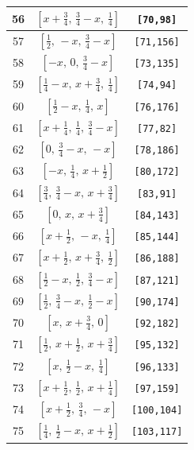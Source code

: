 \documentclass[fleqn,8pt]{jsarticle}
\begin{document}
\begin{longtable}{ccc}
56 & $\left[ x + \frac{3}{4},\, \frac{3}{4} - x,\, \frac{1}{4} \right]$ & {\tt [70,98]} \\ \hline
57 & $\left[ \frac{1}{2},\, - x,\, \frac{3}{4} - x \right]$ & {\tt [71,156]} \\ \hline
58 & $\left[ - x,\, 0,\, \frac{3}{4} - x \right]$ & {\tt [73,135]} \\ \hline
59 & $\left[ \frac{1}{4} - x,\, x + \frac{3}{4},\, \frac{1}{4} \right]$ & {\tt [74,94]} \\ \hline
60 & $\left[ \frac{1}{2} - x,\, \frac{1}{4},\, x \right]$ & {\tt [76,176]} \\ \hline
61 & $\left[ x + \frac{1}{4},\, \frac{1}{4},\, \frac{3}{4} - x \right]$ & {\tt [77,82]} \\ \hline
62 & $\left[ 0,\, \frac{3}{4} - x,\, - x \right]$ & {\tt [78,186]} \\ \hline
63 & $\left[ - x,\, \frac{1}{4},\, x + \frac{1}{2} \right]$ & {\tt [80,172]} \\ \hline
64 & $\left[ \frac{3}{4},\, \frac{3}{4} - x,\, x + \frac{3}{4} \right]$ & {\tt [83,91]} \\ \hline
65 & $\left[ 0,\, x,\, x + \frac{3}{4} \right]$ & {\tt [84,143]} \\ \hline
66 & $\left[ x + \frac{1}{2},\, - x,\, \frac{1}{4} \right]$ & {\tt [85,144]} \\ \hline
67 & $\left[ x + \frac{1}{2},\, x + \frac{3}{4},\, \frac{1}{2} \right]$ & {\tt [86,188]} \\ \hline
68 & $\left[ \frac{1}{2} - x,\, \frac{1}{2},\, \frac{3}{4} - x \right]$ & {\tt [87,121]} \\ \hline
69 & $\left[ \frac{1}{2},\, \frac{3}{4} - x,\, \frac{1}{2} - x \right]$ & {\tt [90,174]} \\ \hline
70 & $\left[ x,\, x + \frac{3}{4},\, 0 \right]$ & {\tt [92,182]} \\ \hline
71 & $\left[ \frac{1}{2},\, x + \frac{1}{2},\, x + \frac{3}{4} \right]$ & {\tt [95,132]} \\ \hline
72 & $\left[ x,\, \frac{1}{2} - x,\, \frac{1}{4} \right]$ & {\tt [96,133]} \\ \hline
73 & $\left[ x + \frac{1}{2},\, \frac{1}{2},\, x + \frac{1}{4} \right]$ & {\tt [97,159]} \\ \hline
74 & $\left[ x + \frac{1}{2},\, \frac{3}{4},\, - x \right]$ & {\tt [100,104]} \\ \hline
75 & $\left[ \frac{1}{4},\, \frac{1}{2} - x,\, x + \frac{1}{2} \right]$ & {\tt [103,117]} \\ \hline

\end{longtable}
\end{document}
